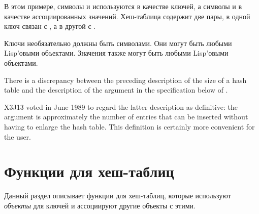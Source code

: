 В этом примере, символы  и  используются в качестве ключей, а
символы  и  в качестве ассоциированных значений. Хеш-таблица
содержит две пары, в одной ключ  связан с , а в другой
 с .

Ключи необязательно должны быть символами. Они могут быть любыми Lisp'овыми
объектами. Значения также могут быть любыми Lisp'овыми объектами.

\begin{newer}
There is a discrepancy between the preceding description of the
size of a hash table and the description of the  argument
in the specification below
of .

X3J13 voted in June 1989  to regard the
latter description as definitive: the  argument
is approximately the number of entries that can be inserted
without having to enlarge the hash table.  This definition is certainly
more convenient for the user.
\end{newer}

\section{Функции для хеш-таблиц}

Данный раздел описывает функции для хеш-таблиц, которые используют
\emph{объекты} для ключей и ассоциируют другие объекты с этими.

